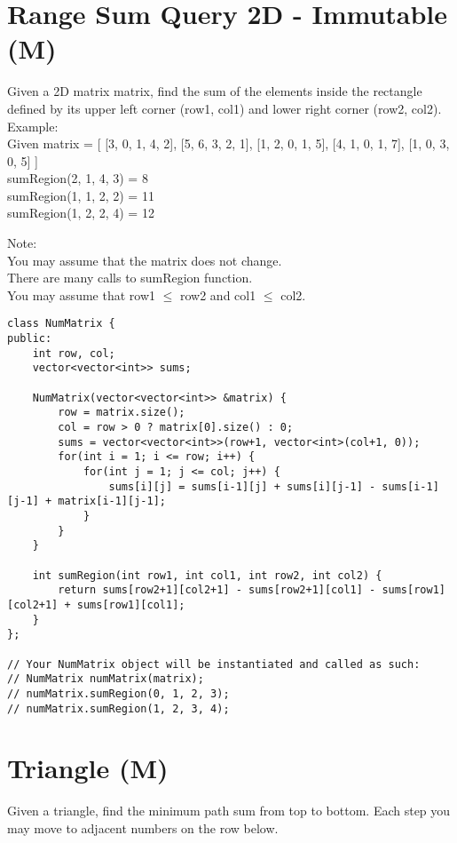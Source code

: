 \section{Range Sum Query 2D - Immutable (M)}
Given a 2D matrix matrix, find the sum of the elements inside the rectangle defined by its upper left corner (row1, col1) and lower right corner (row2, col2). \\

Example:\\
Given matrix = [
  [3, 0, 1, 4, 2], 
  [5, 6, 3, 2, 1], 
  [1, 2, 0, 1, 5], 
  [4, 1, 0, 1, 7], 
  [1, 0, 3, 0, 5] 
]\\
sumRegion(2, 1, 4, 3) = 8\\
sumRegion(1, 1, 2, 2) = 11\\
sumRegion(1, 2, 2, 4) = 12\

Note:\\
    You may assume that the matrix does not change.\\
    There are many calls to sumRegion function.\\
    You may assume that row1 $\leq$ row2 and col1 $\leq$ col2.\\


\begin{lstlisting}
class NumMatrix {
public:
    int row, col;
    vector<vector<int>> sums;
    
    NumMatrix(vector<vector<int>> &matrix) {
        row = matrix.size();
        col = row > 0 ? matrix[0].size() : 0;
        sums = vector<vector<int>>(row+1, vector<int>(col+1, 0));
        for(int i = 1; i <= row; i++) {
            for(int j = 1; j <= col; j++) {
                sums[i][j] = sums[i-1][j] + sums[i][j-1] - sums[i-1][j-1] + matrix[i-1][j-1];
            }
        }
    }

    int sumRegion(int row1, int col1, int row2, int col2) {
        return sums[row2+1][col2+1] - sums[row2+1][col1] - sums[row1][col2+1] + sums[row1][col1];
    }
};

// Your NumMatrix object will be instantiated and called as such:
// NumMatrix numMatrix(matrix);
// numMatrix.sumRegion(0, 1, 2, 3);
// numMatrix.sumRegion(1, 2, 3, 4);
\end{lstlisting}


\section{Triangle (M)}
Given a triangle, find the minimum path sum from top to bottom. Each step you may move to adjacent numbers on the row below.\\

